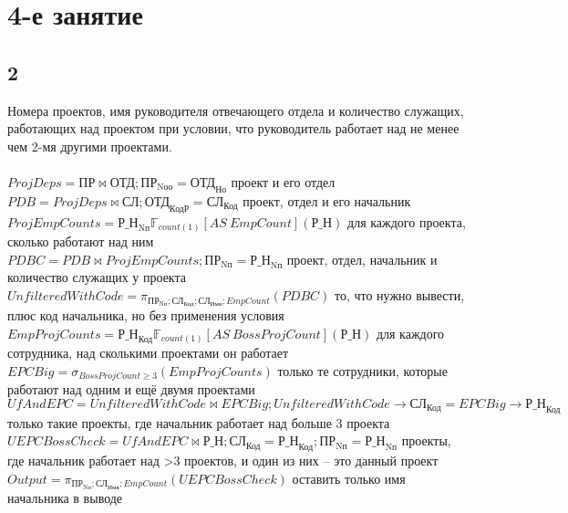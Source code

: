 \documentclass[12pt]{article}
\newcommand{\employee}{\textbf{СЛ}}
\newcommand{\department}{\textbf{ОТД}}
\newcommand{\project}{\textbf{ПР}}
\newcommand{\workson}{\textbf{Р\_Н}}
\newcommand{\employeeName}{\textbf{СЛ}_\text{Имя}}
\newcommand{\employeeId}{\textbf{СЛ}_\text{Код}}
\newcommand{\departmentId}{\textbf{ОТД}_\text{Но}}
\newcommand{\departmentBossId}{\textbf{ОТД}_\text{КодР}}
\newcommand{\projectId}{\textbf{ПР}_\text{Nп}}
\newcommand{\projectResponsibleDepId}{\textbf{ПР}_\text{Nоо}}
\newcommand{\worksonEmpId}{\textbf{Р\_Н}_\text{Код}}
\newcommand{\worksonProjId}{\textbf{Р\_Н}_\text{Nп}}
\newcommand{\filter}[2]{\sigma{}_{#1} \allowbreak \left( #2 \right)}
\newcommand{\join}[3]{ #1 \bowtie #2;\allowbreak #3 }
\newcommand{\select}[2]{\pi_{#1} \allowbreak \left( #2 \right)}
\newcommand{\aggregate}[4]{  #1 \mathbb{F}_{#2} \left[AS\ #3 \right] \left( #4 \right)  }
\begin{document}
\section{4-е занятие}
\subsection{2}

Номера проектов, имя руководителя отвечающего отдела и количество служащих, работающих над проектом при условии, что руководитель работает над не менее чем 2-мя другими проектами.\\\\
    $ ProjDeps = \join{\project}{\department}{\projectResponsibleDepId=\departmentId}$ 
 проект и его отдел \\ 
    $ PDB = \join{ProjDeps}{\employee}{\departmentBossId = \employeeId}$ 
 проект, отдел и его начальник \\ 
    $ ProjEmpCounts = \aggregate{\worksonProjId}{count(1)}{EmpCount}{\workson}$ 
 для каждого проекта, сколько работают над ним \\ 
    $ PDBC = \join{PDB}{ProjEmpCounts}{\projectId = \worksonProjId}$ 
 проект, отдел, начальник и количество служащих у проекта \\ 
    $ UnfilteredWithCode = \select{\projectId; \employeeId; \employeeName; EmpCount}{PDBC}$ 
 то, что нужно вывести, плюс код начальника, но без применения условия \\ 
    $ EmpProjCounts = \aggregate{\worksonEmpId}{count(1)}{BossProjCount}{\workson}$ 
 для каждого сотрудника, над сколькими проектами он работает \\ 
    $ EPCBig = \filter{BossProjCount \geq 3}{EmpProjCounts}$ 
 только те сотрудники, которые работают над одним и ещё двумя проектами \\ 
    $ UfAndEPC = \join{UnfilteredWithCode}{EPCBig}{UnfilteredWithCode\rightarrow\employeeId = EPCBig\rightarrow\worksonEmpId}$ 
 только такие проекты, где начальник работает над больше 3 проекта \\ 
    $ UEPCBossCheck = \join{UfAndEPC}{\workson}{\employeeId = \worksonEmpId; \projectId = \worksonProjId}$ 
 проекты, где начальник работает над >3 проектов, и один из них -- это данный проект \\ 
    $ Output = \select{\projectId; \employeeName; EmpCount}{UEPCBossCheck}$ 
 оставить только имя начальника в выводе \\ 
\end{document}
